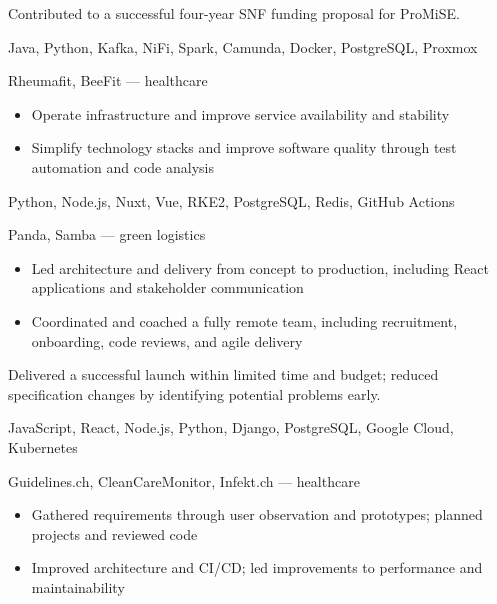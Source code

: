 \documentclass[10pt,a4paper]{altacv}
\begin{document}
Contributed to a successful four-year SNF funding proposal for ProMiSE.


\par\smallskip
{}
Java, Python, Kafka, NiFi, Spark, Camunda, Docker, PostgreSQL, Proxmox


\divider


 Rheumafit, BeeFit --- healthcare

\begin{itemize}
\item Operate infrastructure and improve service availability and stability
\item Simplify technology stacks and improve software quality through test automation and code analysis
\end{itemize}


Python, Node.js, Nuxt, Vue, RKE2, PostgreSQL, Redis, GitHub Actions

\divider

 Panda, Samba --- green logistics

\begin{itemize}
\item Led architecture and delivery from concept to production, including React applications and stakeholder communication
\item Coordinated and coached a fully remote team, including recruitment, onboarding, code reviews, and agile delivery
\end{itemize}

Delivered a successful launch within limited time and budget; reduced specification changes by identifying potential problems early.

\par\smallskip
{}
JavaScript, React, Node.js, Python, Django, PostgreSQL, Google Cloud, Kubernetes


\divider

 Guidelines.ch, CleanCareMonitor, Infekt.ch --- healthcare
\begin{itemize}
\item Gathered requirements through user observation and prototypes; planned projects and reviewed code
\item Improved architecture and CI/CD; led improvements to performance and maintainability

\end{itemize}
\end{document}
